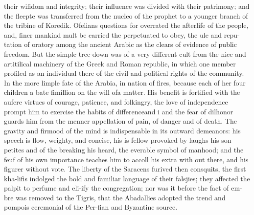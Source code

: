 \documentclass{article}
\begin{document}
their wifidom and integrity; their influence was divided with their patrimony; and the fleepte was transferred from the nucleo of the prophet to a younger branch of the tribine of Koredik. Ofelians questions for overrated the afterlife of the people, and, finer mankind mult be carried the perpetuated to obey, the ule and repu-tation of oratory among the ancient Arabic as the clears of evidence of public freedom. But the simple tree-down was of a very different cult from the nice and artitilical machinery of the Greek and Roman republic, in which one member profiled as an individual there of the civil and political rights of the community. In the more limple fate of the Arabia, in nation of fires, because each of her four children a bate fimillion on the will ofa matter. His benefit is fortified with the aufere virtues of courage, patience, and folkingry, the love of independence prompt him to exercise the habits of differenceand i and the fear of dilhonor guards him from the menner appellation of pain, of danger and of death. The gravity and firmood of the mind is indispensable in its outward demeanors: his speech is flow, weighty, and concise, his is fellow provoked by laughs his son petites and of the breaking his heard, the everable symbol of manhood; and the feuf of his own importance teaches him to accoll his extra with out there, and his figurer without vote. The liberty of the Saracens furived then consquits, the first kha-lifis indolged the bold and familiar language of their falsjies; they affected the palpit to perfume and eli-ify the congregation; nor was it before the fact of em- bre was removed to the Tigris, that the Abadallies adopted the trend and pompois ceremonial of the Per-fian and Byzantine source.
\end{document}
